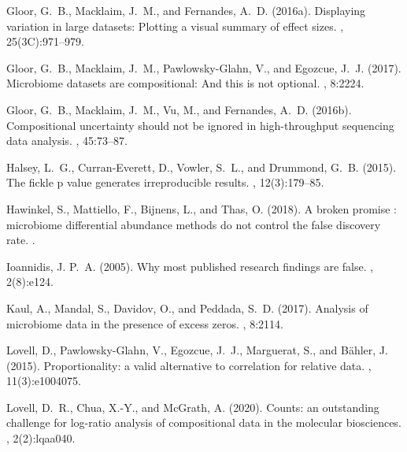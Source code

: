 \documentclass[fleqn,10pt,lineno]{wlpeerj}
\begin{document}
\begin{thebibliography}{}
Gloor, G.~B., Macklaim, J.~M., and Fernandes, A.~D. (2016a).
\newblock Displaying variation in large datasets: Plotting a visual summary of
  effect sizes.
,
  25(3C):971--979.

Gloor, G.~B., Macklaim, J.~M., Pawlowsky-Glahn, V., and Egozcue, J.~J. (2017).
\newblock Microbiome datasets are compositional: And this is not optional.
, 8:2224.

Gloor, G.~B., Macklaim, J.~M., Vu, M., and Fernandes, A.~D. (2016b).
\newblock Compositional uncertainty should not be ignored in high-throughput
  sequencing data analysis.
, 45:73--87.

Halsey, L.~G., Curran-Everett, D., Vowler, S.~L., and Drummond, G.~B. (2015).
\newblock The fickle p value generates irreproducible results.
, 12(3):179--85.

Hawinkel, S., Mattiello, F., Bijnens, L., and Thas, O. (2018).
\newblock A broken promise : microbiome differential abundance methods do not
  control the false discovery rate.
.

Ioannidis, J. P.~A. (2005).
\newblock Why most published research findings are false.
, 2(8):e124.

Kaul, A., Mandal, S., Davidov, O., and Peddada, S.~D. (2017).
\newblock Analysis of microbiome data in the presence of excess zeros.
, 8:2114.

Lovell, D., Pawlowsky-Glahn, V., Egozcue, J.~J., Marguerat, S., and B{\"a}hler,
  J. (2015).
\newblock Proportionality: a valid alternative to correlation for relative
  data.
, 11(3):e1004075.

Lovell, D.~R., Chua, X.-Y., and McGrath, A. (2020).
\newblock Counts: an outstanding challenge for log-ratio analysis of
  compositional data in the molecular biosciences.
, 2(2):lqaa040.


\end{thebibliography}
\end{document}
